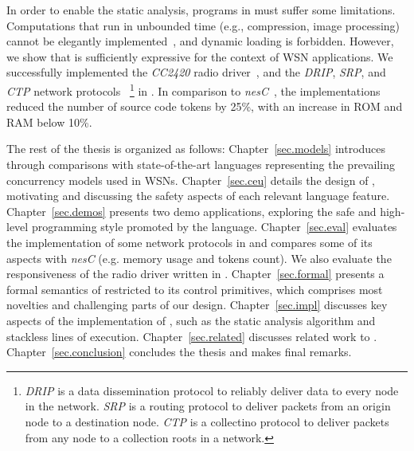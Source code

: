 In order to enable the static analysis, programs in \CEU must suffer some 
limitations.
Computations that run in unbounded time (e.g., compression, image processing) 
cannot be elegantly implemented~\cite{rp.hypothesis}, and dynamic loading is 
forbidden.
%
%
However, we show that \CEU is sufficiently expressive for the context of WSN 
applications.
We successfully implemented the \emph{CC2420} radio driver~\cite{wsn.teps}, and 
the \emph{DRIP}, \emph{SRP}, and \emph{CTP} network protocols~\cite{wsn.teps}%
\footnote{
\emph{DRIP} is a data dissemination protocol to reliably deliver data to every 
node in the network.
\emph{SRP} is a routing protocol to deliver packets from an origin node to a 
destination node.
\emph{CTP} is a collectino protocol to deliver packets from any node to a 
collection roots in a network.
}
in \CEU.
In comparison to \emph{nesC}~\cite{wsn.nesc}, the implementations reduced the 
number of source code tokens by 25\%, with an increase in ROM and RAM below 
10\%.


The rest of the thesis is organized as follows:
%
Chapter~\ref{sec.models} introduces \CEU through comparisons with 
state-of-the-art languages representing the prevailing concurrency models used 
in WSNs.
%
Chapter~\ref{sec.ceu} details the design of \CEU, motivating and discussing the
safety aspects of each relevant language feature.
%
Chapter~\ref{sec.demos} presents two demo applications, exploring the safe and 
high-level programming style promoted by the language.
%
Chapter~\ref{sec.eval} evaluates the implementation of some network protocols 
in \CEU and compares some of its aspects with \emph{nesC} (e.g. memory usage 
and tokens count).
We also evaluate the responsiveness of the radio driver written in \CEU.
%
Chapter~\ref{sec.formal} presents a formal semantics of \CEU restricted to its 
control primitives, which comprises most novelties and challenging parts of our 
design.
%
Chapter~\ref{sec.impl} discusses key aspects of the implementation of \CEU, 
such as the static analysis algorithm and stackless lines of execution.
%
Chapter~\ref{sec.related} discusses related work to \CEU.
%
Chapter~\ref{sec.conclusion} concludes the thesis and makes final remarks.
